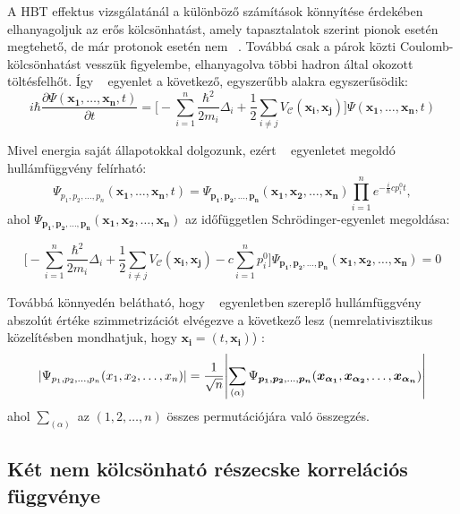 \documentclass[11pt,a4paper]{article}
\numberwithin{equation}{subsection}
\numberwithin{figure}{section}
\begin{document}
A HBT effektus vizsgálatánál a különböző számítások könnyítése érdekében elhanyagoljuk az erős kölcsönhatást, amely tapasztalatok szerint pionok esetén megtehető, de már protonok esetén nem ~\cite{Pratt:1990zq}. Továbbá csak a párok közti Coulomb-kölcsönhatást vesszük figyelembe, elhanyagolva többi hadron által okozott töltésfelhőt. Így ~ egyenlet a következő, egyszerűbb alakra egyszerűsödik:
\begin{equation}
i\hbar\frac{\partial \Psi(\bm{x_1},\dots, \bm{x_n},t )}{\partial t} = \Bigg[-\sum_{i=1}^{n}\frac{\hbar^2}{2m_i}\Delta_i + \frac{1}{2}\sum_{i\neq j} V_\mathcal{C}(\bm{x_i},\bm{x_j})\Bigg]\Psi(\bm{x_1},\dots, \bm{x_n} ,t)
\label{eq:Sch}
\end{equation}

Mivel energia saját állapotokkal dolgozunk, ezért  ~ egyenletet megoldó hullámfüggvény felírható:
\begin{equation}
\Psi_{p_1, {p_2}, \dots, {p_n}}(\bm{x_1},\dots, \bm{x_n},t )  
= \Psi_{\bm{p_1}, \bm{p_2}, \dots, \bm{p_n}}(\bm{x_1}, \bm{x_2}, \dots, \bm{x_n})\prod_{i=1}^ne^{-\frac{i}{\hbar}cp_i^0t},
\end{equation}
ahol $\Psi_{\bm{p_1}, \bm{p_2}, \dots, \bm{p_n}}(\bm{x_1}, \bm{x_2}, \dots, \bm{x_n})$ az időfüggetlen Schrödinger-egyenlet megoldása:

\begin{equation}
\Bigg[-\sum_{i=1}^{n}\frac{\hbar^2}{2m_i}\Delta_i + \frac{1}{2}\sum_{i\neq j} V_\mathcal{C}(\bm{x_i},\bm{x_j})  
 - c\sum_{i=1}^n p_i^0
 \Bigg]\Psi_{\bm{p_1}, \bm{p_2}, \dots, \bm{p_n}}(\bm{x_1}, \bm{x_2}, \dots, \bm{x_n}) = 0
\end{equation}

Továbbá könnyedén belátható, hogy ~ egyenletben szereplő hullámfüggvény abszolút értéke szimmetrizációt elvégezve a következő lesz  (nemrelativisztikus közelítésben mondhatjuk, hogy $\bm{x_i} = (t,\bm{x_i})$) :
\begin{equation}
\abs{\Psi_{{p_1},{p_2}, \dots,{p_n}}({x_1}, {x_2}, \dots, {x_n})} = \frac{1}{\sqrt{n}}\abs{\sum_{(\alpha)}\Psi_{\bm{p_1}, \bm{p_2}, \dots, \bm{p_n}}(\bm{x_{\alpha_1}}, \bm{x_{\alpha_2}}, \dots, \bm{x_{\alpha_n}})}
\label{eq:Psin}
\end{equation}
ahol $\sum_{(\alpha)}$ az $(1,2,\dots,n)$ összes permutációjára való összegzés.


\subsection{Két nem kölcsönható részecske korrelációs függvénye}\label{sec:C20}
\end{document}
